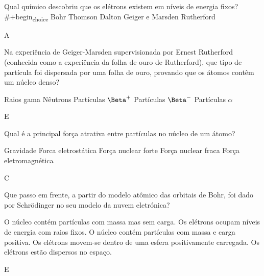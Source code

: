 \documentclass[11pt]{article}
\begin{document}
\begin{exercise}
Qual químico descobriu que os elétrons existem em níveis de energia fixos?
\#+begin\textsubscript{choice} 
\choice Bohr
\choice Thomson
\choice Dalton
\choice Geiger e Marsden
\choice Rutherford
\end{exercise}
\begin{solution}
A
\end{solution}



\begin{exercise}
Na experiência de Geiger-Marsden supervisionada por Ernest Rutherford (conhecida como a experiência da folha de ouro de Rutherford), que tipo de partícula foi dispersada por uma folha de ouro, provando que os átomos contêm um núcleo denso?

\begin{choice}
\choice Raios gama
\choice Nêutrons
\choice Partículas \(\Beta^+\)
\choice Partículas \(\Beta^-\)
\choice Partículas \(\alpha\)
\end{choice}
\end{exercise}

\begin{solution}
E
\end{solution}


\begin{exercise}
Qual é a principal força atrativa entre partículas no núcleo de um átomo?

\begin{choice}
\choice Gravidade
\choice Forca eletrostática
\choice Força nuclear forte
\choice Força nuclear fraca
\choice Força eletromagnética
\end{choice}
\end{exercise}
\begin{solution}
C
\end{solution}


\begin{exercise}
Que passo em frente, a partir do modelo atômico das orbitais de Bohr, foi dado por Schrödinger no seu modelo da nuvem eletrónica?

\begin{choice}
\choice O núcleo contém partículas com massa mas sem carga.
\choice Os elétrons ocupam níveis de energia com raios fixos.
\choice O núcleo contém partículas com massa e carga positiva.
\choice Os elétrons movem-se dentro de uma esfera positivamente carregada.
\choice Os elétrons estão dispersos no espaço.
\end{choice}
\end{exercise}
\begin{solution}
E
\end{solution}
\end{document}
